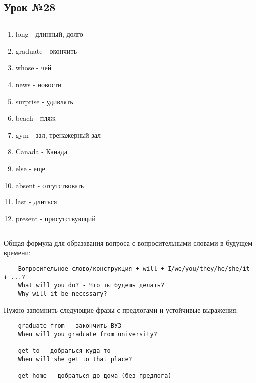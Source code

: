 \subsection{Урок №28}

\subsection*{}
\begin{multicols}{2}
    \begin{enumerate}\setlength{\itemsep}{0pt}
        \item long - длинный, долго
        \item graduate - окончить
        \item whose - чей
        \item news - новости
        \item surprise - удивлять
        \item beach - пляж
        \item gym - зал, тренажерный зал
        \item Canada - Канада
        \item else - еще
        \item absent - отсутствовать
        \item last - длиться
        \item present - присутствующий
    \end{enumerate}
\end{multicols}

\subsection*{}
Общая формула для образования вопроса с вопросительными словами в будущем времени:
\begin{verbatim}
    Вопросительное слово/конструкция + will + I/we/you/they/he/she/it + ...?
    What will you do? - Что ты будешь делать?
    Why will it be necessary?
\end{verbatim}

Нужно запомнить следующие фразы с предлогами и устойчивые выражения:
\begin{verbatim}
    graduate from - закончить ВУЗ
    When will you graduate from university?

    get to - добраться куда-то
    When will she get to that place?

    get home - добраться до дома (без предлога)
\end{verbatim}